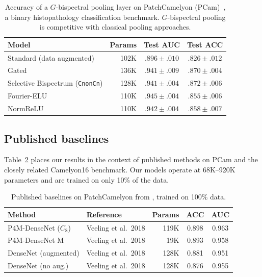 \documentclass{article}
\theoremstyle{definition}
\theoremstyle{remark}
\theoremstyle{definition}
\begin{document}
\begin{table}[h]
  \caption{Accuracy of a $G$-bispectral pooling layer on PatchCamelyon (PCam)~\citep{veeling2018rotation}, a binary histopathology classification benchmark. $G$-bispectral pooling is competitive with classical pooling approaches.}
  \label{tab:pcam-results}
  \centering
  \small
  \begin{tabular}{lrcc}
    \toprule
    Model & Params & Test AUC & Test ACC \\
    \midrule
    Standard (data augmented)          & 102K & $.896 \pm .010$ & $.826 \pm .012$ \\
    Gated                         & 136K & $.941 \pm .009$ & $.870 \pm .004$ \\
    Selective Bispectrum (\texttt{CnonCn})  & 128K & $.941 \pm .004$ & $\mathbf{.872 \pm .006}$ \\
    Fourier-ELU                   & 110K & $\mathbf{.945 \pm .004}$ & $.855 \pm .006$ \\
    NormReLU                      & 110K & $.942 \pm .004$ & $.858 \pm .007$ \\
    \bottomrule
  \end{tabular}
\end{table}

\subsection{Published baselines}

Table~\ref{tab:pcam-context} places our results in the context of
published methods on PCam and the closely related Camelyon16
benchmark. Our models operate at 68K--920K parameters and are
trained on only 10\% of the data.

\begin{table}[h]
  \caption{Published baselines on PatchCamelyon from
    \citet{veeling2018rotation}, trained on 100\% data.}
  \label{tab:pcam-context}
  \centering
  \small
  \begin{tabular}{llrcc}
    \toprule
    Method & Reference & Params & ACC & AUC \\
    \midrule
    P4M-DenseNet ($C_8$)  & Veeling et al.\ 2018     & 119K & 0.898 & 0.963 \\
    P4M-DenseNet M        & Veeling et al.\ 2018     &  19K & 0.893 & 0.958 \\
    DenseNet (augmented)   & Veeling et al.\ 2018     & 128K & 0.881 & 0.951 \\
    DenseNet (no aug.)     & Veeling et al.\ 2018     & 128K & 0.876 & 0.955 \\
    \bottomrule
  \end{tabular}
\end{table}
\end{document}
